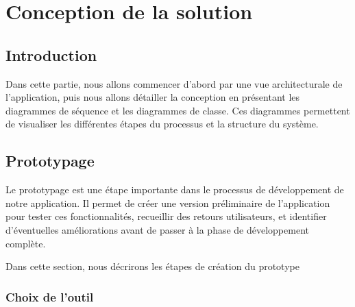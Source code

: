 \chapter{Conception de la solution}
\label{Conception de la solution}

\section*{Introduction}

Dans cette partie, nous allons commencer d’abord par une vue architecturale de
l’application, puis nous allons détailler la conception en présentant les
diagrammes de séquence et les diagrammes de classe. Ces diagrammes permettent de visualiser les différentes étapes du processus et la structure du système.

\pagebreak
\section{Prototypage}

Le prototypage est une étape importante dans le processus de développement de notre application. Il permet de créer une version préliminaire de
 l'application pour tester ces fonctionnalités, recueillir des retours utilisateurs, et identifier d'éventuelles améliorations avant de passer à la phase de développement complète.

 Dans cette section, nous décrirons les étapes de création du prototype

\subsection{Choix de l'outil}

